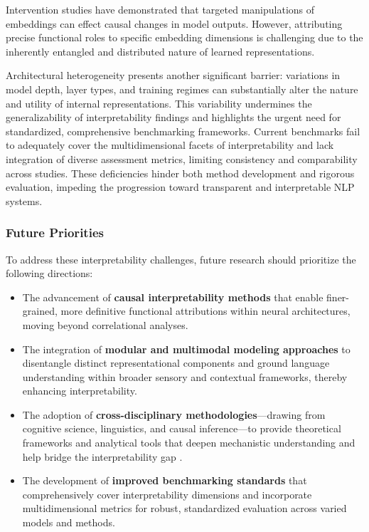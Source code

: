 \documentclass[sigconf]{acmart}
\begin{document}
Intervention studies have demonstrated that targeted manipulations of embeddings can effect causal changes in model outputs. However, attributing precise functional roles to specific embedding dimensions is challenging due to the inherently entangled and distributed nature of learned representations.

Architectural heterogeneity presents another significant barrier: variations in model depth, layer types, and training regimes can substantially alter the nature and utility of internal representations. This variability undermines the generalizability of interpretability findings and highlights the urgent need for standardized, comprehensive benchmarking frameworks. Current benchmarks fail to adequately cover the multidimensional facets of interpretability and lack integration of diverse assessment metrics, limiting consistency and comparability across studies. These deficiencies hinder both method development and rigorous evaluation, impeding the progression toward transparent and interpretable NLP systems.

\subsubsection{Future Priorities}

To address these interpretability challenges, future research should prioritize the following directions:

\begin{itemize}
  \item The advancement of \textbf{causal interpretability methods} that enable finer-grained, more definitive functional attributions within neural architectures, moving beyond correlational analyses.
  \item The integration of \textbf{modular and multimodal modeling approaches} to disentangle distinct representational components and ground language understanding within broader sensory and contextual frameworks, thereby enhancing interpretability.
  \item The adoption of \textbf{cross-disciplinary methodologies}—drawing from cognitive science, linguistics, and causal inference—to provide theoretical frameworks and analytical tools that deepen mechanistic understanding and help bridge the interpretability gap \cite{ref36}.
  \item The development of \textbf{improved benchmarking standards} that comprehensively cover interpretability dimensions and incorporate multidimensional metrics for robust, standardized evaluation across varied models and methods.
\end{itemize}
\end{document}
